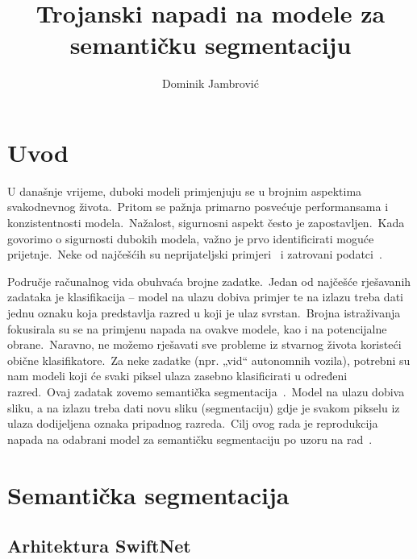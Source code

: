 \documentclass[times, utf8, seminar, numeric]{fer}
\begin{document}
\title{Trojanski napadi na modele za semantičku segmentaciju}

\author{Dominik Jambrović}


\maketitle

\tableofcontents

\chapter{Uvod}

U današnje vrijeme, duboki modeli primjenjuju se u brojnim aspektima svakodnevnog života.\ Pritom se pažnja primarno posvećuje performansama i konzistentnosti modela.\
Nažalost, sigurnosni aspekt često je zapostavljen.\ Kada govorimo o sigurnosti dubokih modela, važno je prvo identificirati moguće prijetnje.\ 
Neke od najčešćih su neprijateljski primjeri~\cite{goodfellow2014explaining} i zatrovani podatci~\cite{chen2017targeted}.\
  
Područje računalnog vida obuhvaća brojne zadatke.\ Jedan od najčešće rješavanih zadataka je klasifikacija – model na ulazu dobiva primjer te na izlazu treba dati jednu oznaku koja predstavlja razred u koji je ulaz svrstan.\ 
Brojna istraživanja fokusirala su se na primjenu napada na ovakve modele, kao i na potencijalne obrane.\ Naravno, ne možemo rješavati sve probleme iz stvarnog života koristeći obične klasifikatore.\ 
Za neke zadatke (npr. „vid“ autonomnih vozila), potrebni su nam modeli koji će svaki piksel ulaza zasebno klasificirati u određeni razred.\ Ovaj zadatak zovemo semantička segmentacija~\cite{garcia2017review}.\
Model na ulazu dobiva sliku, a na izlazu treba dati novu sliku (segmentaciju) gdje je svakom pikselu iz ulaza dodijeljena oznaka pripadnog razreda.\ Cilj ovog rada je reprodukcija napada na odabrani model za semantičku segmentaciju po uzoru na rad~\cite{li2021hidden}.

\chapter{Semantička segmentacija}

\section{Arhitektura SwiftNet}
\end{document}
